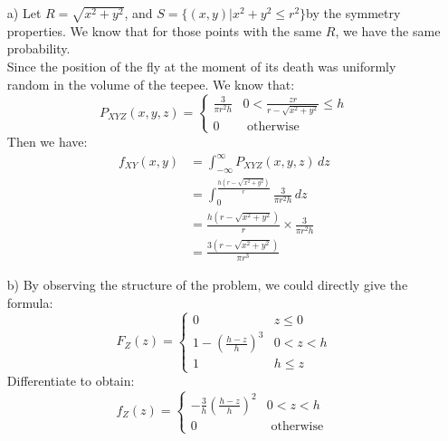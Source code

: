 \documentclass[hidelinks]{article}
\begin{document}
\begin{enumerate}
    \item[a)] Let $R = \sqrt{x^2 + y^2}$, and $S = \{(x,y) | x^2 + y^2 \leq r^2\}$by the symmetry properties. We know that for those points with the same $R$, we have the same probability. \\
    Since the position of the fly at the moment of its death was uniformly random in the volume of the teepee. We know that: 
    \[
    P_{XYZ}(x,y,z) = 
    \begin{cases}
        \frac{3}{\pi r^2h} & 0 < \frac{zr}{r - \sqrt{x^2 + y^2}} \leq  h\\
        0 & \text{ otherwise }
    \end{cases}
    \]
    Then we have:
    \begin{align*}
        f_{XY}(x,y) &= \int^\infty_{-\infty} P_{XYZ}(x,y,z) \, dz \\
                    &= \int^{\frac{h(r - \sqrt{x^2 + y^2})}{r}}_{0} \frac{3}{\pi r^2h} \, dz \\
                    &= \frac{h(r - \sqrt{x^2 + y^2})}{r} \times \frac{3}{\pi r^2h} \\
                    &= \frac{3(r - \sqrt{x^2 + y^2})}{\pi r^3}
    \end{align*}

    \item [b)] By observing the structure of the problem, we could directly give the formula:
    \begin{equation*}
        F_Z(z) =
        \begin{cases}
            0 & z \leq 0 \\
            1 - (\frac{h-z}{h})^3 & 0 < z < h\\
            1 & h \leq z
        \end{cases}
    \end{equation*}
    Differentiate to obtain:
    \begin{equation*}
        f_Z(z) = 
        \begin{cases}
            -\frac{3}{h}(\frac{h-z}{h})^2 & 0 < z < h\\
            0 & \text{ otherwise }
        \end{cases}
    \end{equation*}
\end{enumerate}
\end{document}
